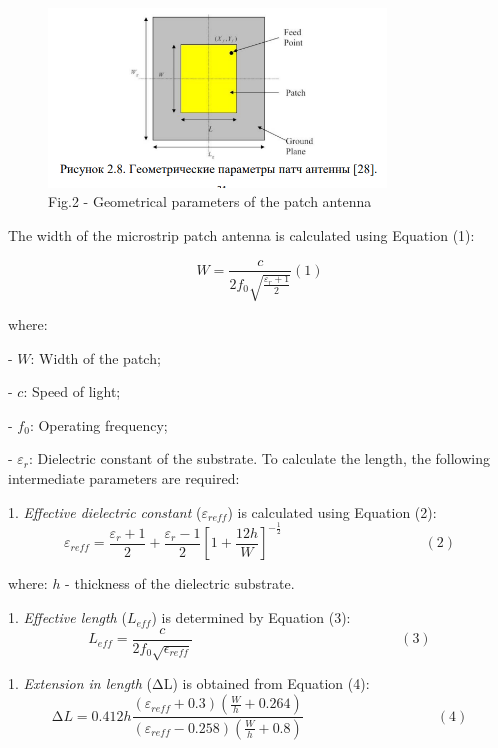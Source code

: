 \begin{figure}[H]
	\centering
	\includegraphics[width=0.8\textwidth]{media/ict/image42}
	\caption*{Fig.2 - Geometrical parameters of the patch antenna}
\end{figure}

\begin{multicols}{2}
The width of the microstrip patch antenna is calculated using Equation
(1):

\[W = \frac{c}{2f_{0}\sqrt{\frac{\varepsilon_{r} + 1}{2}}} (1)\]

where:


- \(W\): Width of the patch;

- \(c\): Speed of light;

- \(f_{0}\)\hspace{0pt}: Operating frequency;

- \(\varepsilon_{r}\)\hspace{0pt}: Dielectric constant of the substrate.
To calculate the length, the following intermediate parameters are
required:


1. \emph{Effective dielectric constant} (\(\varepsilon_{reff}\)) is
calculated using Equation (2):
\[\varepsilon_{reff} = \frac{\varepsilon_{r} + 1}{2} + \frac{\varepsilon_{r} - 1}{2}\left\lbrack 1 + \frac{12h}{W} \right\rbrack^{- \frac{1}{2}}\ \ \ \ \ \ \ \ \ \ \ \ \ \ \ \ \ \ \ \ \ \ \ \ \ \ \ \ \ \ \ \ \ \ \ \ \ \ \ \ \ \ \ \ \ \ (2)\]

where: \(h\) - thickness of the dielectric substrate.

\setcounter{enumi}{1}

1. \emph{Effective length} (\(L_{eff}\)) is determined by Equation (3):
\[L_{eff} = \frac{c}{2f_{0}\sqrt{\epsilon_{reff}}}\ \ \ \ \ \ \ \ \ \ \ \ \ \ \ \ \ \ \ \ \ \ \ \ \ \ \ \ \ \ \ \ \ \ \ \ \ \ \ \ \ \ \ \ \ \ \ \ \ \ \ \ \ \ \ \ \ \ \ \ \ \ \ \ \ \ \ (3)\]

\setcounter{enumi}{2}

1. \emph{Extension in length} (ΔL) is obtained from Equation (4):
\[\mathrm{\Delta}L = 0.412h\frac{(\varepsilon_{reff} + 0.3)(\frac{W}{h} + 0.264)}{(\varepsilon_{reff} - 0.258)(\frac{W}{h} + 0.8)}\ \ \ \ \ \ \ \ \ \ \ \ \ \ \ \ \ \ \ \ \ \ \ \ \ \ \ \ \ \ \ \ \ \ \ \ \ \ \ \ \ \ \ (4)\]


\end{multicols}
